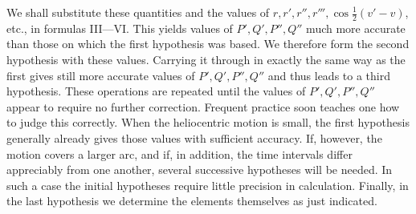 We shall substitute these quantities and the values of $r,r',r'',r''',\cos\tfrac12(v'-v)$, etc., in formulas III—VI. This yields values of $P',Q',P'',Q''$ much more accurate than those on which the first hypothesis was based. We therefore form the second hypothesis with these values. Carrying it through in exactly the same way as the first gives still more accurate values of $P',Q',P'',Q''$ and thus leads to a third hypothesis. These operations are repeated until the values of $P',Q',P'',Q''$ appear to require no further correction. Frequent practice soon teaches one how to judge this correctly. When the heliocentric motion is small, the first hypothesis generally already gives those values with sufficient accuracy. If, however, the motion covers a larger arc, and if, in addition, the time intervals differ appreciably from one another, several successive hypotheses will be needed. In such a case the initial hypotheses require little precision in calculation. Finally, in the last hypothesis we determine the elements themselves as just indicated.
